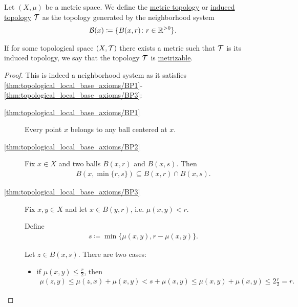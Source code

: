 \begin{definition}\label{def:metric_topology}\cite[249]{Engelking1989}
  Let $(X, \mu)$ be a metric space. We define the \ul{metric topology} or \ul{induced topology} $\mathcal T$ as the topology generated by the neighborhood system
  \begin{align*}
    \mathcal B(x) \coloneqq \{ B (x, r) \colon r \in \mathbb R^{>0} \}.
  \end{align*}

  If for some topological space $(X, \mathcal T)$ there exists a metric such that $\mathcal T$ is its induced topology, we say that the topology $\mathcal T$ is \ul{metrizable}.
\end{definition}
\begin{proof}
  This is indeed a neighborhood system as it satisfies \ref{thm:topological_local_base_axioms/BP1}-\ref{thm:topological_local_base_axioms/BP3}:

  \begin{description}
    \item[\ref{thm:topological_local_base_axioms/BP1}] Every point $x$ belongs to any ball centered at $x$.

    \item[\ref{thm:topological_local_base_axioms/BP2}] Fix $x \in X$ and two balls $B(x, r)$ and $B(x, s)$. Then
    \begin{align*}
      B(x, \min\{ r, s \}) \subseteq B(x, r) \cap B(x, s).
    \end{align*}

    \item[\ref{thm:topological_local_base_axioms/BP3}] Fix $x, y \in X$ and let $x \in B(y, r)$, i.e. $\mu(x, y) < r$.

    Define
    \begin{align*}
      s \coloneqq \min\{ \mu(x, y), r - \mu(x, y) \}.
    \end{align*}

    Let $z \in B(x, s)$. There are two cases:
    \begin{itemize}
      \item if $\mu(x, y) \leq \tfrac r 2$, then
      \begin{align*}
        \mu(z, y)
        \leq
        \mu(z, x) + \mu(x, y)
        <
        s + \mu(x, y)
        \leq
        \mu(x, y) + \mu(x, y)
        \leq
        2 \tfrac r 2
        =
        r.
      \end{align*}


\end{itemize}
\end{description}
\end{proof}
